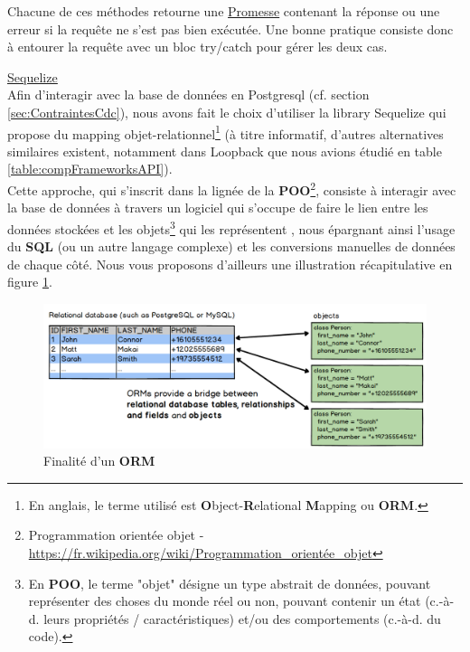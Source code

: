 Chacune de ces méthodes retourne une \href{https://developer.mozilla.org/fr/docs/Web/JavaScript/Guide/Utiliser_les_promesses}{Promesse} contenant la réponse ou une erreur si la requête ne s'est pas bien exécutée. Une bonne pratique consiste donc à entourer la requête avec un bloc try/catch pour gérer les deux cas.\\


\noindent\underline{\href{https://sequelize.org/master/}{Sequelize}}\\

Afin d'interagir avec la base de données en Postgresql (cf. section \ref{sec:ContraintesCdc}), nous avons fait le choix d'utiliser la \gls{library} Sequelize qui propose du mapping objet-relationnel\footnote{
    En anglais, le terme utilisé est \textbf{O}bject-\textbf{R}elational \textbf{M}apping ou \textbf{ORM}.
} (à titre informatif, d'autres alternatives similaires existent, notamment dans Loopback que nous avions étudié en table \ref{table:compFrameworksAPI}).\\

Cette approche, qui s'inscrit dans la lignée de la \textbf{POO}\footnote{
    Programmation orientée objet -
    \href{https://fr.wikipedia.org/wiki/Programmation\_orient\%C3\%A9e\_objet}{https://fr.wikipedia.org/wiki/Programmation\_orientée\_objet}
}, consiste à interagir avec la base de données à travers un logiciel qui s'occupe de faire le lien entre les données stockées et les objets\footnote{
    En \textbf{POO}, le terme "objet" désigne un type abstrait de données, pouvant représenter des choses du monde réel ou non, pouvant contenir un état (c.-à-d. leurs propriétés / caractéristiques) et/ou des comportements (c.-à-d. du code).
} qui les représentent
, nous épargnant ainsi l'usage du \textbf{SQL} (ou un autre langage complexe) et les conversions manuelles de données de chaque côté. 
Nous vous proposons d'ailleurs une illustration récapitulative en figure \ref{fig:ORMExplanations}.

\begin{figure}[H]
    \includegraphics[width=\textwidth,height=\textheight,keepaspectratio]{images/libraries/orms-bridge.png}
    \centering
    \caption[Finalité d'un \textbf{ORM}]{Finalité d'un \textbf{ORM}}
    \label{fig:ORMExplanations}
\end{figure}

